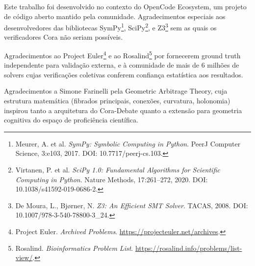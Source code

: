 Este trabalho foi desenvolvido no contexto do OpenCode Ecosystem, um projeto
de código aberto mantido pela comunidade. Agradecimentos especiais aos
desenvolvedores das bibliotecas SymPy\footnote{Meurer, A. et al. \textit{SymPy:
Symbolic Computing in Python}. PeerJ Computer Science, 3:e103, 2017. DOI:
10.7717/peerj-cs.103.}, SciPy\footnote{Virtanen, P. et al. \textit{SciPy 1.0:
Fundamental Algorithms for Scientific Computing in Python}. Nature Methods,
17:261--272, 2020. DOI: 10.1038/s41592-019-0686-2.}, e Z3\footnote{De Moura,
L., Bjørner, N. \textit{Z3: An Efficient SMT Solver}. TACAS, 2008. DOI:
10.1007/978-3-540-78800-3\_24.} sem as quais os verificadores Cora não seriam
possíveis.

Agradecimentos ao Project Euler\footnote{Project Euler. \textit{Archived
Problems}. \url{https://projecteuler.net/archives}.} e ao Rosalind\footnote{Rosalind. \textit{Bioinformatics Problem List}.
\url{https://rosalind.info/problems/list-view/}.} por fornecerem ground truth
independente para validação externa, e à comunidade de mais de 6 milhões de
solvers cujas verificações coletivas conferem confiança estatística aos
resultados.

Agradecimentos a Simone Farinelli pela Geometric Arbitrage Theory, cuja
estrutura matemática (fibrados principais, conexões, curvatura, holonomia)
inspirou tanto a arquitetura do Cora-Debate quanto a extensão para geometria
cognitiva do espaço de proficiência científica.
